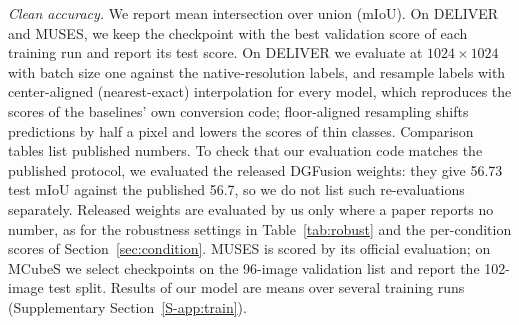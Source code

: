 \emph{Clean accuracy.} We report mean intersection over union (mIoU). On DELIVER and MUSES, we keep the checkpoint with the best validation score of each training run and report its test score. On DELIVER we evaluate at $1024\times1024$ with batch size one against the native-resolution labels, and resample labels with center-aligned (nearest-exact) interpolation for every model, which reproduces the scores of the baselines' own conversion code; floor-aligned resampling shifts predictions by half a pixel and lowers the scores of thin classes.
Comparison tables list published numbers. To check that our evaluation code matches the published protocol, we evaluated the released DGFusion weights: they give 56.73 test mIoU against the published 56.7, so we do not list such re-evaluations separately. Released weights are evaluated by us only where a paper reports no number, as for the robustness settings in Table~\ref{tab:robust} and the per-condition scores of Section~\ref{sec:condition}. MUSES is scored by its official evaluation; on MCubeS we select checkpoints on the 96-image validation list and report the 102-image test split. Results of our model are means over several training runs (Supplementary Section~\ref{S-app:train}).

